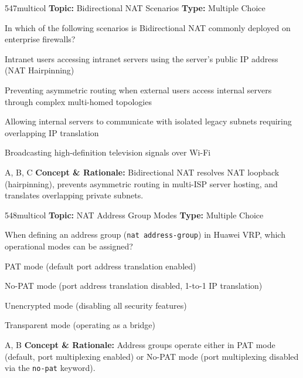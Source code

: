 \begin{qcard}{547}{multicol}
\textcolor{darkslate!75}{\small\textbf{Topic:} Bidirectional NAT Scenarios \hfill \textbf{Type:} Multiple Choice}\vspace{0.4em}\par
In which of the following scenarios is Bidirectional NAT commonly deployed on enterprise firewalls?
\begin{qoptions}
\item Intranet users accessing intranet servers using the server's public IP address (NAT Hairpinning)
\item Preventing asymmetric routing when external users access internal servers through complex multi-homed topologies
\item Allowing internal servers to communicate with isolated legacy subnets requiring overlapping IP translation
\item Broadcasting high-definition television signals over Wi-Fi
\end{qoptions}
\end{qcard}
\nopagebreak
\begin{explainbox}{A, B, C}
\textbf{Concept \& Rationale:} Bidirectional NAT resolves NAT loopback (hairpinning), prevents asymmetric routing in multi-ISP server hosting, and translates overlapping private subnets.
\end{explainbox}

\begin{qcard}{548}{multicol}
\textcolor{darkslate!75}{\small\textbf{Topic:} NAT Address Group Modes \hfill \textbf{Type:} Multiple Choice}\vspace{0.4em}\par
When defining an address group (\texttt{nat address-group}) in Huawei VRP, which operational modes can be assigned?
\begin{qoptions}
\item PAT mode (default port address translation enabled)
\item No-PAT mode (port address translation disabled, 1-to-1 IP translation)
\item Unencrypted mode (disabling all security features)
\item Transparent mode (operating as a bridge)
\end{qoptions}
\end{qcard}
\nopagebreak
\begin{explainbox}{A, B}
\textbf{Concept \& Rationale:} Address groups operate either in PAT mode (default, port multiplexing enabled) or No-PAT mode (port multiplexing disabled via the \texttt{no-pat} keyword).
\end{explainbox}

